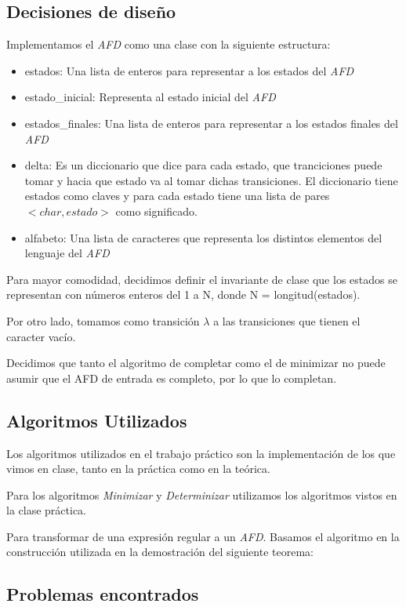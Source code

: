 \subsection{Decisiones de diseño}
Implementamos el \emph{AFD} como una clase con la siguiente estructura:

\begin{itemize}
	\item estados: Una lista de enteros para representar a los estados del \emph{AFD}
	\item estado\_inicial: Representa al estado inicial del \emph{AFD}
	\item estados\_finales: Una lista de enteros para representar a los estados finales del \emph{AFD}
	\item delta: Es un diccionario que dice para cada estado, que tranciciones puede tomar y hacia que estado va al tomar dichas transiciones. El diccionario tiene estados como claves y para cada estado tiene una lista de pares $<char, estado>$ como significado.
	\item alfabeto: Una lista de caracteres que representa los distintos elementos del lenguaje del \emph{AFD}
\end{itemize}

Para mayor comodidad, decidimos definir el invariante de clase que los estados se representan con números enteros del 1 a N, donde N = longitud(estados).

Por otro lado, tomamos como transición $\lambda$ a las transiciones que tienen el caracter vacío.

Decidimos que tanto el algoritmo de completar como el de minimizar no puede asumir que el AFD de entrada es completo, por lo que lo completan.

\subsection{Algoritmos Utilizados}

Los algoritmos utilizados en el trabajo práctico son la implementación de los que vimos en clase, tanto en la práctica como en la teórica.

Para los algoritmos \emph{Minimizar} y \emph{Determinizar} utilizamos los algoritmos vistos en la clase práctica.

Para transformar de una expresión regular a un \emph{AFD}. Basamos el algoritmo en la construcción utilizada en la demostración del siguiente teorema:


\subsection{Problemas encontrados}

